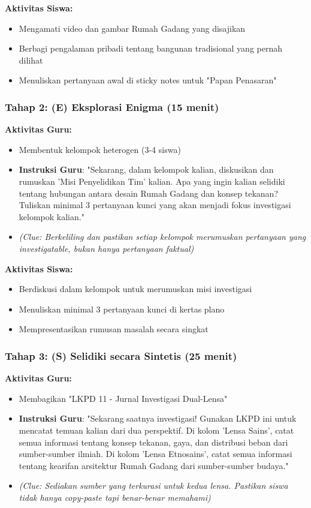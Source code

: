 \documentclass[12pt,a4paper]{article}
\begin{document}
\textbf{Aktivitas Siswa:}
\begin{itemize}
\item Mengamati video dan gambar Rumah Gadang yang disajikan
\item Berbagi pengalaman pribadi tentang bangunan tradisional yang pernah dilihat
\item Menuliskan pertanyaan awal di sticky notes untuk "Papan Penasaran"
\end{itemize}

\subsubsection{Tahap 2: (E) Eksplorasi Enigma (15 menit)}

\textbf{Aktivitas Guru:}
\begin{itemize}
\item Membentuk kelompok heterogen (3-4 siswa)
\item \textbf{Instruksi Guru}: "Sekarang, dalam kelompok kalian, diskusikan dan rumuskan 'Misi Penyelidikan Tim' kalian. Apa yang ingin kalian selidiki tentang hubungan antara desain Rumah Gadang dan konsep tekanan? Tuliskan minimal 3 pertanyaan kunci yang akan menjadi fokus investigasi kelompok kalian."
\item \textit{(Clue: Berkeliling dan pastikan setiap kelompok merumuskan pertanyaan yang investigatable, bukan hanya pertanyaan faktual)}
\end{itemize}

\textbf{Aktivitas Siswa:}
\begin{itemize}
\item Berdiskusi dalam kelompok untuk merumuskan misi investigasi
\item Menuliskan minimal 3 pertanyaan kunci di kertas plano
\item Mempresentasikan rumusan masalah secara singkat
\end{itemize}

\subsubsection{Tahap 3: (S) Selidiki secara Sintetis (25 menit)}

\textbf{Aktivitas Guru:}
\begin{itemize}
\item Membagikan "LKPD 11 - Jurnal Investigasi Dual-Lensa"
\item \textbf{Instruksi Guru}: "Sekarang saatnya investigasi! Gunakan LKPD ini untuk mencatat temuan kalian dari dua perspektif. Di kolom 'Lensa Sains', catat semua informasi tentang konsep tekanan, gaya, dan distribusi beban dari sumber-sumber ilmiah. Di kolom 'Lensa Etnosains', catat semua informasi tentang kearifan arsitektur Rumah Gadang dari sumber-sumber budaya."
\item \textit{(Clue: Sediakan sumber yang terkurasi untuk kedua lensa. Pastikan siswa tidak hanya copy-paste tapi benar-benar memahami)}
\end{itemize}
\end{document}
